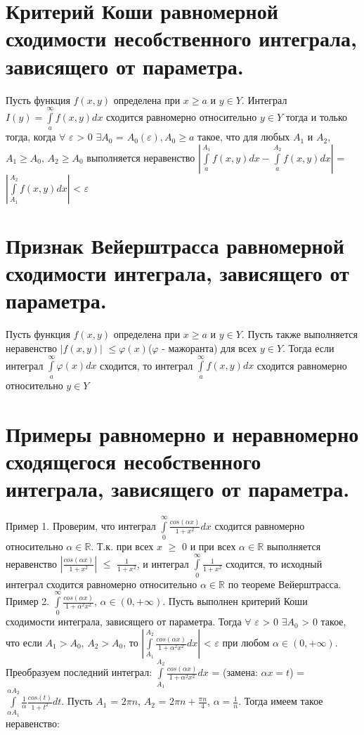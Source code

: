 \documentclass[12pt, a4paper]{article}
\begin{document}
\section{Критерий Коши равномерной сходимости несобственного интеграла, зависящего от параметра.}
Пусть функция $f(x, y)$ определена при $x \geq a$ и $y \in Y$.
Интеграл $I(y) = \int\limits_a^{\infty} f(x, y)dx$ сходится равномерно относительно
$y \in Y$ тогда и только тогда, когда $\forall$ $\varepsilon$ > 0 $\exists 
A_0$ = $A_0(\varepsilon), A_0 \geq a$ такое, что для любых $A_1$ и $A_2$, 
$A_1 \geq A_0$, $A_2 \geq A_0$ выполняется неравенство 
$|\int\limits_a^{A_1} f(x, y)dx - \int\limits_a^{A_2} f(x, y)dx |$  = 
$|\int\limits_{A_1}^{A_2} f(x, y)dx|$ < $\varepsilon$

\section{Признак Вейерштрасса равномерной сходимости интеграла, зависящего от параметра.}
Пусть функция $f(x, y)$ определена при $x \geq a$ и $y \in Y$.
Пусть также выполняется неравенство $|f(x, y)|$ $\leq \varphi(x)$($\varphi$
- мажоранта) для всех $y \in Y$. Тогда если интеграл $\int\limits_a^{\infty}
\varphi(x)dx$ сходится, то интеграл $\int\limits_a^{\infty}f(x, y)dx$
сходится равномерно относительно $y \in Y$

\section{Примеры равномерно и неравномерно сходящегося несобственного интеграла, зависящего от параметра.}
Пример 1.
\newline
Проверим, что интеграл $\int\limits_0^{\infty}\frac{cos(\alpha x)}{1 + x^2}dx$
сходится равномерно относительно $\alpha \in \mathbb{R}$.
Т.к. при всех $x$ $\geq$ $0$ и при всех $\alpha \in \mathbb{R}$ выполняется
неравенство $|\frac{cos(\alpha x)}{1 + x^2}|$ $\leq$ $\frac{1}{1 + x^2}$,
и интеграл $\int\limits_0^{\infty}\frac{1}{1 + x^2}$ сходится, то исходный интеграл
сходится равномерно относительно $\alpha \in \mathbb{R}$ по теореме Вейерштрасса.
\newline
Пример 2.
\newline
$\int\limits_0^{\infty}\frac{cos(\alpha x)}{1 + \alpha^2 x^2}$, $\alpha \in
(0, +\infty)$. Пусть выполнен критерий Коши сходимости интеграла, зависящего
от параметра. Тогда $\forall$ $\varepsilon$ > 0 $\exists A_0$ > 0 такое, что
если $A_1 > A_0$, $A_2 > A_0$, то $| \int\limits_{A_1}^{A_2}\frac{cos(\alpha x)}
{1 + \alpha ^ 2 x^2}dx|$ < $\varepsilon$ при любом $\alpha \in 
(0, + \infty)$. Преобразуем последний интеграл: $\int\limits_{A_1}^{A_2}\frac{cos(\alpha x)}
{1 + \alpha ^ 2 x^2}dx$ = (замена: $\alpha x = t$) = $\int\limits_{\alpha A_1}^
{\alpha A_2}\frac{1}{\alpha}\frac{cos(t)}{1 + t^2}dt$. Пусть $A_1$ = $2\pi n$,
$A_2$ = $2\pi n + \frac{\pi n}{4}$, $\alpha = \frac{1}{n}$. Тогда имеем такое
неравенство: 
\end{document}
